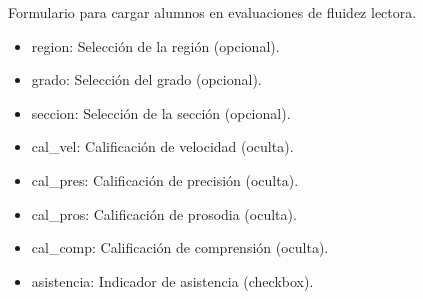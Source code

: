 \documentclass[letterpaper,10pt,spanish]{sphinxmanual}
\begin{document}
\begin{fulllineitems}

\pysigstartsignatures
{}
\pysigstopsignatures
\sphinxAtStartPar
Formulario para cargar alumnos en evaluaciones de fluidez lectora.
\begin{description}
\begin{itemize}
\item {} 
\sphinxAtStartPar
region: Selección de la región (opcional).

\item {} 
\sphinxAtStartPar
grado: Selección del grado (opcional).

\item {} 
\sphinxAtStartPar
seccion: Selección de la sección (opcional).

\item {} 
\sphinxAtStartPar
cal\_vel: Calificación de velocidad (oculta).

\item {} 
\sphinxAtStartPar
cal\_pres: Calificación de precisión (oculta).

\item {} 
\sphinxAtStartPar
cal\_pros: Calificación de prosodia (oculta).

\item {} 
\sphinxAtStartPar
cal\_comp: Calificación de comprensión (oculta).

\item {} 
\sphinxAtStartPar
asistencia: Indicador de asistencia (checkbox).

\end{itemize}

\end{description}


\begin{fulllineitems}

\pysigstartsignatures
{}
\pysigstopsignatures
\end{fulllineitems}




\end{fulllineitems}
\end{document}
